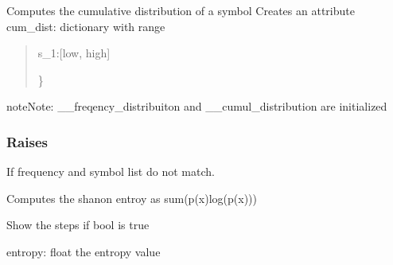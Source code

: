 \documentclass[letterpaper,10pt,english]{sphinxmanual}
\begin{document}
\begin{fulllineitems}
\begin{description}
\sphinxAtStartPar
Computes the cumulative distribution of a symbol
Creates an attribute cum\_dist: dictionary with range
\begin{quote}
\begin{description}
\sphinxlineitem{\{}
\sphinxAtStartPar
s\_1:{[}low, high{]}

\end{description}

\sphinxAtStartPar
\}
\end{quote}

\end{description}

\begin{sphinxadmonition}{note}{Note:}
\sphinxAtStartPar
\_\_freqency\_distribuiton and \_\_cumul\_distribution are initialized
\end{sphinxadmonition}


\subsubsection{Raises}
\label{\detokenize{core:raises}}\begin{description}
\sphinxAtStartPar
If frequency and symbol list do not match.

\end{description}

\begin{fulllineitems}
\label{\detokenize{core:core.data.Data.shannon_entropy}}
\pysigstartsignatures
{}
\pysigstopsignatures
\sphinxAtStartPar
Computes the shanon entroy as sum(p(x)log(p(x)))
\begin{description}
\begin{description}
\sphinxAtStartPar
Show the steps if bool is true

\end{description}

\sphinxAtStartPar
entropy: float
the entropy value

\end{description}


\end{fulllineitems}
\end{fulllineitems}
\end{document}
